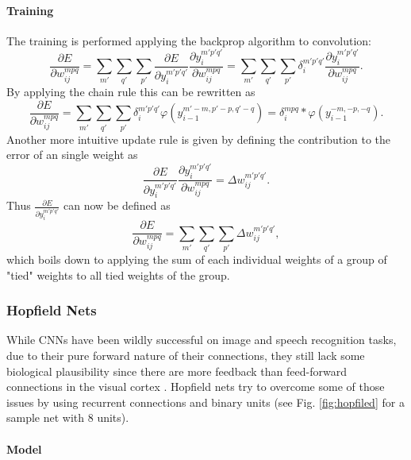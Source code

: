 \paragraph{Training} \label{c:cnntraining}


The training is performed applying the backprop algorithm to convolution:
\[
\frac{\partial E}{\partial w_{ij}^{mpq}} = \sum_{m'} \sum_ {q'}  \sum_{p'} \frac{\partial E}{\partial y_i^{m' p' q'}}  \frac{\partial y_i^{m' p' q'}}{\partial w_{ij}^{mpq}}  = \sum_{m'} \sum_ {q'}  \sum_{p'} \delta_i^{m' p' q'}  \frac{\partial y_i^{m' p' q'}}{\partial w_{ij}^{mpq}}.
\] 
By applying the chain rule this can be rewritten as
\[
\frac{\partial E}{\partial w_{ij}^{mpq}} = \sum_{m'} \sum_ {q'}  \sum_{p'} \delta_i^{m' p' q'}  \varphi(y_{i-1}^{m'-m, p'-p, q'-q}) = \delta_i^{m p q}  * \varphi(y_{i-1}^{-m, -p, -q}).
\] 
Another more intuitive update rule is given by defining the contribution to the error of an single weight as
\[
\frac{\partial E}{\partial y_i^{m' p' q'}}  \frac{\partial y_i^{m' p' q'}}{\partial w_{ij}^{mpq}}  = \Delta w_{ij}^{m' p' q'}.
\] 
Thus $\frac{\partial E}{\partial y_i^{m' p' q'}}$ can now be defined as
\[
\frac{\partial E}{\partial w_{ij}^{mpq}} = \sum_{m'} \sum_ {q'}  \sum_{p'} \Delta w_{ij}^{m' p' q'},
\] 
which boils down to applying the sum of each individual weights of a group of "tied" weights to all tied weights of the group.



\subsubsection{Hopfield Nets} \label{c:hopnets}

While CNNs have been wildly successful on image and speech recognition tasks, due to their pure forward nature of their connections, they still lack some biological plausibility since there are more feedback than feed-forward connections in the visual cortex .
Hopfield nets try to overcome some of those issues by using recurrent connections and binary units \cite{hopfield1982neural} \cite{Goodfellow-et-al-2016-Book} (see Fig. \ref{fig:hopfiled} for a sample net with 8 units).

\paragraph{Model} \label{c:hopmodel}

